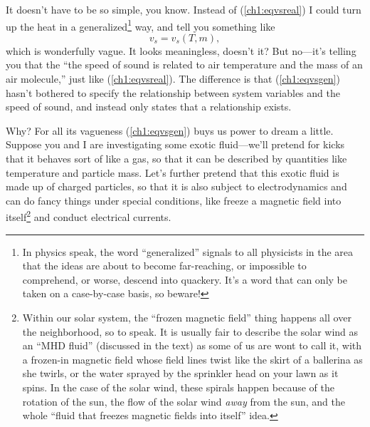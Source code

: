 It doesn't have to be so simple, you know. Instead of
(\ref{ch1:eqvsreal}) I could turn up the heat in a
generalized\footnote{In physics speak, the word ``generalized'' signals to all
  physicists in the area that the ideas are about to become far-reaching, or
  impossible to comprehend, or worse, descend into quackery. It's a word that
  can only be taken on a case-by-case basis, so beware!}  way, and tell you
something like
\begin{equation}
  \label{ch1:eqvsgen}
  v_s = v_s (T, m),
\end{equation}
which is wonderfully vague. It looks meaningless, doesn't it? But no---it's
telling you that the ``the speed of sound is related to air temperature and the
mass of an air molecule,'' just like (\ref{ch1:eqvsreal}). The
difference is that (\ref{ch1:eqvsgen}) hasn't bothered to specify the
relationship between system variables and the speed of sound, and instead only
states that a relationship exists.

Why? For all its vagueness (\ref{ch1:eqvsgen}) buys us power to dream a
little. Suppose you and I are investigating some exotic fluid---we'll pretend
for kicks that it behaves sort of like a gas, so that it can be described by
quantities like temperature and particle mass. Let's further pretend that this
exotic fluid is made up of charged particles, so that it is also subject to
electrodynamics and can do fancy things under special conditions, like freeze a
magnetic field into itself\footnote{Within our solar system, the ``frozen
  magnetic field'' thing happens all over the neighborhood, so to speak. It is
  usually fair to describe the solar wind as an ``MHD fluid'' (discussed in the
  text) as some of us are wont to call it, with a frozen-in magnetic field whose
  field lines twist like the skirt of a ballerina as she twirls, or the water
  sprayed by the sprinkler head on your lawn as it spins. In the case of the
  solar wind, these spirals happen because of the rotation of the sun, the flow
  of the solar wind \emph{away} from the sun, and the whole ``fluid that freezes
  magnetic fields into itself'' idea.}  and conduct electrical currents.

